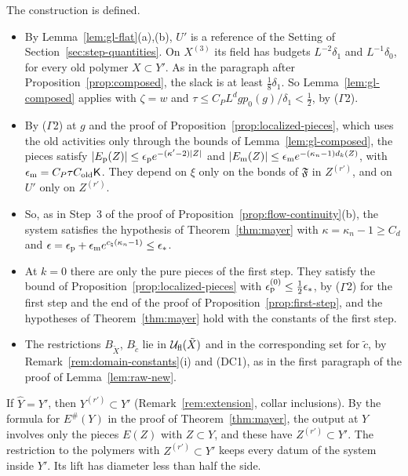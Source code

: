 The construction is defined.
\begin{itemize}
\item By Lemma~\ref{lem:gl-flat}(a),(b), $U'$ is a reference of the Setting of Section~\ref{sec:step-quantities}. On $X^{(3)}$ its field has budgets $L^{-2}\delta_1$ and $L^{-1}\delta_0$, for every old polymer $X\subset Y'$. As in the paragraph after Proposition~\ref{prop:composed}, the slack is at least $\frac18\delta_1$. So Lemma~\ref{lem:gl-composed} applies with $\zeta=w$ and $\tau\le C_PL^dgp_0(g)/\delta_1<\frac12$, by ($\Gamma$2).
\item By ($\Gamma$2) at $g$ and the proof of Proposition~\ref{prop:localized-pieces}, which uses the old activities only through the bounds of Lemma~\ref{lem:gl-composed}, the pieces satisfy $|E_{\rm p}(Z)|\le\epsilon_{\rm p}e^{-(\kappa'-2)|Z|}$ and $|E_{\rm m}(Z)|\le\epsilon_{\rm m}e^{-(\kappa_n-1)d_k(Z)}$, with $\epsilon_{\rm m}=C_P\tau C_{\rm old}\mathsf K$. They depend on $\xi$ only on the bonds of $\mathfrak F$ in $Z^{(r')}$, and on $U'$ only on $Z^{(r')}$.
\item So, as in Step~3 of the proof of Proposition~\ref{prop:flow-continuity}(b), the system satisfies the hypothesis of Theorem~\ref{thm:mayer} with $\kappa=\kappa_n-1\ge C_d$ and $\epsilon=\epsilon_{\rm p}+\epsilon_{\rm m}e^{c_\natural(\kappa_n-1)}\le\epsilon_*$.
\item At $k=0$ there are only the pure pieces of the first step. They satisfy the bound of Proposition~\ref{prop:localized-pieces} with $\epsilon^{(0)}_{\rm p}\le\frac12\epsilon_*$, by ($\Gamma$2) for the first step and the end of the proof of Proposition~\ref{prop:first-step}, and the hypotheses of Theorem~\ref{thm:mayer} hold with the constants of the first step.
\item The restrictions $B_{\tilde X}$, $B_{\tilde c}$ lie in $\mathcal U_{\rm fl}(\tilde X)$ and in the corresponding set for $\tilde c$, by Remark~\ref{rem:domain-constants}(i) and (DC1), as in the first paragraph of the proof of Lemma~\ref{lem:raw-new}.
\end{itemize}
If $\hat Y=Y'$, then $Y^{(r')}\subset Y'$ (Remark~\ref{rem:extension}, collar inclusions). By the formula for $E^\#(Y)$ in the proof of Theorem~\ref{thm:mayer}, the output at $Y$ involves only the pieces $E(Z)$ with $Z\subset Y$, and these have $Z^{(r')}\subset Y'$. The restriction to the polymers with $Z^{(r')}\subset Y'$ keeps every datum of the system inside $Y'$. Its lift has diameter less than half the side.

